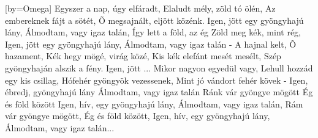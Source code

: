 [by={Omega}]
\beginverse
Egyszer a nap, úgy elfáradt,
Elaludt mély, zöld tó ölén,
Az embereknek fájt a sötét,
Õ megsajnált, eljött közénk.
\endverse
\beginchorus
Igen, jött egy gyöngyhajú lány,
Álmodtam, vagy igaz talán,
Így lett a föld, az ég
Zöld meg kék, mint rég,
Igen, jött egy gyöngyhajú lány,
Álmodtam, vagy igaz talán -
\endchorus
\beginverse
A hajnal kelt, Õ hazament,
Kék hegy mögé, virág közé,
Kis kék elefánt mesét mesélt,
Szép gyöngyhaján alszik a fény.
\endverse
\beginchorus
Igen, jött ...
\endchorus
\beginverse
Mikor nagyon egyedül vagy,
Lehull hozzád egy kis csillag,
Hófehér gyöngyök vezessenek,
Mint jó vándort fehér kövek -
\endverse
\beginchorus
Igen, ébredj, gyöngyhajú lány
Álmodtam, vagy igaz talán
Ránk vár gyöngye mögött
Ég és föld között
\endchorus
\beginchorus
Igen, hív, egy gyöngyhajú lány,
Álmodtam, vagy igaz talán,
Rám vár gyöngye mögött,
Ég és föld között,
Igen, hív, egy gyöngyhajú lány,
Álmodtam, vagy igaz talán...
\endchorus
\endsong
